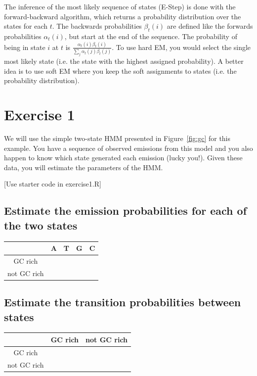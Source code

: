 \documentclass[11pt, oneside]{article}
\begin{document}
The inference of the most likely sequence of states (E-Step) is done with the forward-backward algorithm, which returns a probability distribution over the states for each $t$. The backwards probabilities $\beta_t(i)$ are defined like the forwards probabilities $\alpha_t(i)$, but start at the end of the sequence. The probability of being in state $i$ at $t$ is $\frac{\alpha_t(i)\beta_t(i)}{\sum_j \alpha_t(j)\beta_t(j)}$. To use hard EM, you would select the single most likely state (i.e. the state with the highest assigned probability). A better idea is to use soft EM where you keep the soft assignments to states (i.e. the probability distribution).


\section{Exercise 1}
We will use the simple two-state HMM presented in Figure~\ref{fig:gc} for this example.
You have a sequence of observed emissions from this model and you also happen to know which state generated each emission (lucky you!). 
Given these data, you will estimate the parameters of the HMM.

[Use starter code in exercise1.R]

\subsection{Estimate the emission probabilities for each of the two states}
\begin{table}[H]
\centering
\begin{tabular}{|c|c|c|c|c|}
\hline
& A & T & G & C \\\hline
GC rich & & & &  \\\hline
not GC rich & & & & \\\hline
\end{tabular}
\end{table}

\subsection{Estimate the transition probabilities between states}
\begin{table}[H]
\centering
\begin{tabular}{|c|c|c|}
\hline
& GC rich & not GC rich \\\hline
GC rich & &  \\\hline
not GC rich & &  \\\hline
\end{tabular}
\end{table}
\end{document}
